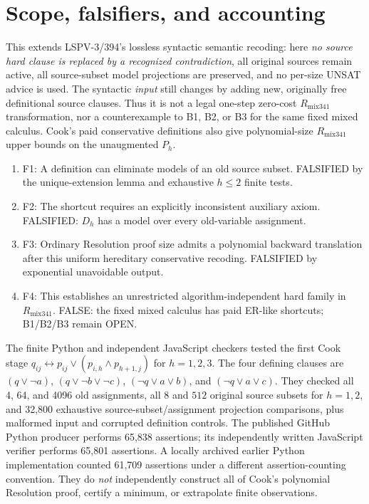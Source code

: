 \documentclass[11pt]{article}
\begin{document}
\section*{Scope, falsifiers, and accounting}
This extends LSPV-3/394's lossless syntactic semantic recoding: here \emph{no source hard clause is replaced by a recognized contradiction}, all original sources remain active, all source-subset model projections are preserved, and no per-size UNSAT advice is used. The syntactic \emph{input} still changes by adding new, originally free definitional source clauses. Thus it is not a legal one-step zero-cost $R_{\mathrm{mix341}}$ transformation, nor a counterexample to B1, B2, or B3 for the same fixed mixed calculus. Cook's paid conservative definitions also give polynomial-size $R_{\mathrm{mix341}}$ upper bounds on the unaugmented $P_h$.

\begin{enumerate}
\item[] F1: A definition can eliminate models of an old source subset. FALSIFIED by the unique-extension lemma and exhaustive $h\le2$ finite tests.
\item[] F2: The shortcut requires an explicitly inconsistent auxiliary axiom. FALSIFIED: $D_h$ has a model over every old-variable assignment.
\item[] F3: Ordinary Resolution proof size admits a polynomial backward translation after this uniform hereditary conservative recoding. FALSIFIED by exponential unavoidable output.
\item[] F4: This establishes an unrestricted algorithm-independent hard family in $R_{\mathrm{mix341}}$. FALSE: the fixed mixed calculus has paid ER-like shortcuts; B1/B2/B3 remain OPEN.
\end{enumerate}
The finite Python and independent JavaScript checkers tested the first Cook stage $q_{ij}\leftrightarrow p_{ij}\lor(p_{i,h}\land p_{h+1,j})$ for $h=1,2,3$. The four defining clauses are $(q\lor\neg a)$, $(q\lor\neg b\lor\neg c)$, $(\neg q\lor a\lor b)$, and $(\neg q\lor a\lor c)$. They checked all 4, 64, and 4096 old assignments, all $8$ and $512$ original source subsets for $h=1,2$, and 32,800 exhaustive source-subset/assignment projection comparisons, plus malformed input and corrupted definition controls. The published GitHub Python producer performs 65,838 assertions; its independently written JavaScript verifier performs 65,801 assertions. A locally archived earlier Python implementation counted 61,709 assertions under a different assertion-counting convention. They do \emph{not} independently construct all of Cook's polynomial Resolution proof, certify a minimum, or extrapolate finite observations.
\end{document}
